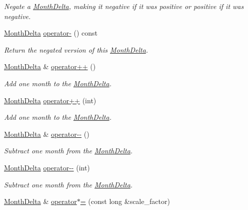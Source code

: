 \begin{DoxyCompactItemize}
\begin{DoxyCompactList}\small\item\em Negate a \hyperlink{structMonthDelta}{Month\-Delta}, making it negative if it was positive or positive if it was negative. \end{DoxyCompactList}\item 
\hyperlink{structMonthDelta}{Month\-Delta} \hyperlink{structMonthDelta_a5d754349cccfb68c729461b7a96d666f}{operator-\/} () const 
\begin{DoxyCompactList}\small\item\em Return the negated version of this \hyperlink{structMonthDelta}{Month\-Delta}. \end{DoxyCompactList}\item 
\hyperlink{structMonthDelta}{Month\-Delta} \& \hyperlink{structMonthDelta_a2d925db7f08eb18d1dcd4961d8149b48}{operator++} ()
\begin{DoxyCompactList}\small\item\em Add one month to the \hyperlink{structMonthDelta}{Month\-Delta}. \end{DoxyCompactList}\item 
\hyperlink{structMonthDelta}{Month\-Delta} \hyperlink{structMonthDelta_afcbef7f90cde7cf06a312da4acd5a1b9}{operator++} (int)
\begin{DoxyCompactList}\small\item\em Add one month to the \hyperlink{structMonthDelta}{Month\-Delta}. \end{DoxyCompactList}\item 
\hyperlink{structMonthDelta}{Month\-Delta} \& \hyperlink{structMonthDelta_a792c4dd313efad2aec9dc80b7d18dc4e}{operator-\/-\/} ()
\begin{DoxyCompactList}\small\item\em Subtract one month from the \hyperlink{structMonthDelta}{Month\-Delta}. \end{DoxyCompactList}\item 
\hyperlink{structMonthDelta}{Month\-Delta} \hyperlink{structMonthDelta_a57b2bfc986e466491dc6ae5546988de7}{operator-\/-\/} (int)
\begin{DoxyCompactList}\small\item\em Subtract one month from the \hyperlink{structMonthDelta}{Month\-Delta}. \end{DoxyCompactList}\item 
\hyperlink{structMonthDelta}{Month\-Delta} \& \hyperlink{structMonthDelta_a0f26a2f2f8dca7cdfc6c1e9baab2f495}{operator$\ast$=} (const long \&scale\-\_\-factor)

\end{DoxyCompactItemize}
